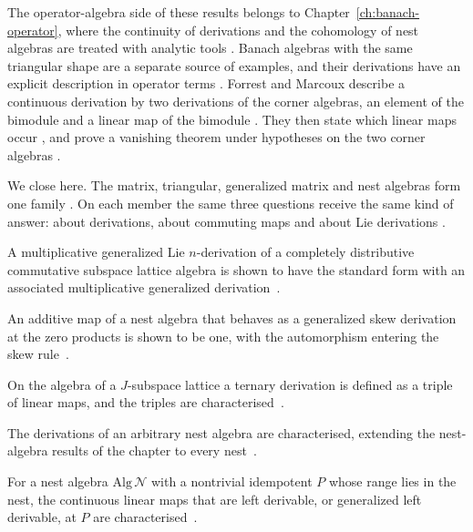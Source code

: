 The operator-algebra side of these results belongs to
Chapter~\ref{ch:banach-operator}, where the continuity of derivations and the
cohomology of nest algebras are treated with analytic tools
\cite[Theorem~2.1, p.~156]{Christensen1977}. Banach algebras with the same
triangular shape are a separate source of examples, and their derivations have an
explicit description in operator terms
\cite[Proposition~2.1, p.~443]{ForrestMarcoux1996}. Forrest and Marcoux describe
a continuous derivation by two derivations of the corner algebras, an element of
the bimodule and a linear map of the bimodule
\cite[Proposition~2.1, p.~443]{ForrestMarcoux1996}. They then state which linear
maps occur \cite[Proposition~2.2, p.~444]{ForrestMarcoux1996}, and prove a
vanishing theorem under hypotheses on the two corner algebras
\cite[Theorem~2.8, p.~448]{ForrestMarcoux1996}.

We close here. The matrix, triangular, generalized matrix and nest algebras form
one family \cite[p.~2720]{DuWang2012}. On each member the same three questions
receive the same kind of answer: about derivations, about commuting maps and
about Lie derivations \cite[Theorem~11, p.~307]{Cheung2003}.

A multiplicative generalized Lie $n$-derivation of a completely distributive commutative subspace lattice algebra is shown to have the standard form with an associated multiplicative generalized derivation~\cite{WlMultiplicativeGeneralizedL2019}.

An additive map of a nest algebra that behaves as a generalized skew derivation at the zero products is shown to be one, with the automorphism entering the skew rule~\cite{WlGeneralizedSkewDerivations2011}.

On the algebra of a $J$-subspace lattice a ternary derivation is defined as a triple of linear maps, and the triples are characterised~\cite{WlStructureAndRelatedApplication2019}.

The derivations of an arbitrary nest algebra are characterised, extending the nest-algebra results of the chapter to every nest~\cite{WlCharacterizingDerivationsForAn2014}.

For a nest algebra $\mathrm{Alg}\,\mathcal{N}$ with a nontrivial idempotent $P$ whose range lies in the nest, the continuous linear maps that are left derivable, or generalized left derivable, at $P$ are characterised~\cite{WlLeftDerivableMapsAtNonTrivialI2019}.

